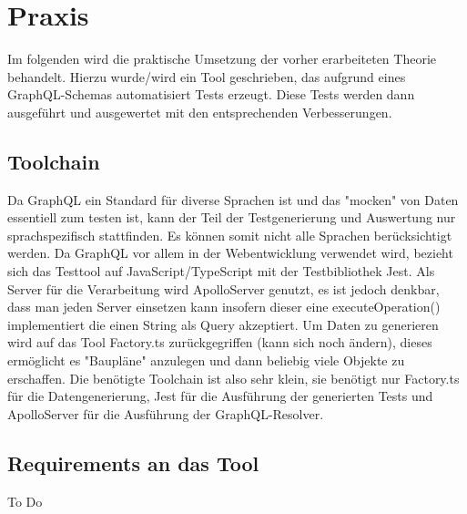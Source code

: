 \section*{Praxis}

Im folgenden wird die praktische Umsetzung der vorher erarbeiteten Theorie behandelt.
Hierzu wurde/wird ein Tool geschrieben, das aufgrund eines GraphQL-Schemas automatisiert Tests erzeugt.
Diese Tests werden dann ausgeführt und ausgewertet mit den entsprechenden Verbesserungen.

\subsection*{Toolchain}

Da GraphQL ein Standard für diverse Sprachen ist und das "mocken" von Daten essentiell zum testen ist, kann
der Teil der Testgenerierung und Auswertung nur sprachspezifisch stattfinden. Es können somit nicht alle
Sprachen berücksichtigt werden.
Da GraphQL vor allem in der Webentwicklung verwendet wird, bezieht sich das Testtool auf JavaScript/TypeScript
mit der Testbibliothek Jest.
Als Server für die Verarbeitung wird ApolloServer genutzt, es ist jedoch denkbar,
dass man jeden Server einsetzen kann insofern dieser eine executeOperation() implementiert die einen
String als Query akzeptiert.
Um Daten zu generieren wird auf das Tool Factory.ts zurückgegriffen (kann sich noch ändern), dieses
ermöglicht es "Baupläne" anzulegen und dann beliebig viele Objekte zu erschaffen.
Die benötigte Toolchain ist also sehr klein, sie benötigt nur Factory.ts für die Datengenerierung,
Jest für die Ausführung der generierten Tests und
ApolloServer für die Ausführung der GraphQL-Resolver.

\subsection*{Requirements an das Tool}

To Do